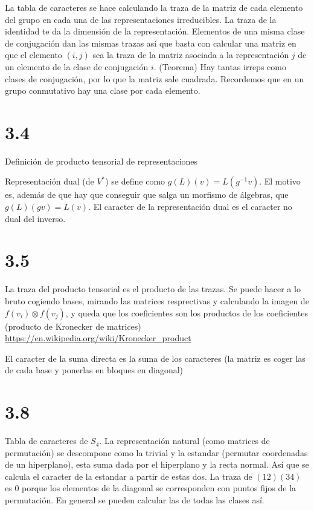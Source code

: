 \documentclass[ANAyTR.tex]{subfiles}
\begin{document}
La tabla de caracteres se hace calculando la traza de la matriz de cada elemento del grupo en cada una de las representaciones irreducibles. La traza de la identidad te da la dimensión de la representación. Elementos de una misma clase de conjugación dan las mismas trazas así que basta con calcular una matriz en que el elemento $(i,j)$ sea la traza de la matriz asociada a la representación $j$ de un elemento de la clase de conjugación $i$. (Teorema) Hay tantas irreps como clases de conjugación, por lo que la matriz sale cuadrada. Recordemos que en un grupo conmutativo hay una clase por cada elemento. 

\section{3.4}
Definición de producto tensorial de representaciones

Representación dual (de $V^*$) se define como $g(L)(v)=L(g^{-1}v)$. El motivo es, además de que hay que conseguir que salga un morfismo de álgebras, que $g(L)(gv)=L(v)$. El caracter de la representación dual es el caracter no dual del inverso. 

\section{3.5}

La traza del producto tensorial es el producto de las trazas. Se puede hacer a lo bruto cogiendo bases, mirando las matrices resprectivas y calculando la imagen de $f(v_i)\otimes f(v_j)$, y queda que los coeficientes son los productos de los coeficientes (producto de Kronecker de matrices) \url{https://en.wikipedia.org/wiki/Kronecker_product}

El caracter de la suma directa es la suma de los caracteres (la matriz es coger las de cada base y ponerlas en bloques en diagonal) 


\section{3.8}
Tabla de caracteres de $S_4$. La representación natural (como matrices de permutación) se descompone como la trivial y la estandar (permutar coordenadas de un hiperplano), esta suma dada por el hiperplano y la recta normal. Así que se calcula el caracter de la estandar a partir de estas dos. La traza de $(12)(34)$ es 0 porque los elementos de la diagonal se corresponden con puntos fijos de la permutación. En general se pueden calcular las de todas las clases así. 
\end{document}
